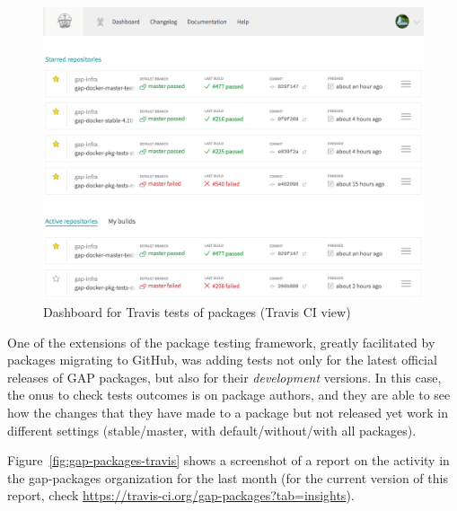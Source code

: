 \begin{figure}[!ht]
    \centering
    \includegraphics[width=\textwidth]{images/gap-infra-travis}
    \caption{Dashboard for Travis tests of \GAP packages (Travis CI view)}
    \label{fig:gap-infra-travis}
\end{figure}

One of the extensions of the package testing framework, greatly 
facilitated by packages migrating to GitHub, was adding tests not
only for the latest official releases of GAP packages, but also
for their \emph{development} versions.
In this case, the onus to check tests outcomes is on package authors,
and they are able to see how the changes that they have made to
a package but not released yet work in different settings (stable/master,
with default/without/with all packages).

Figure~\ref{fig:gap-packages-travis} shows a screenshot of a 
report on the activity in the gap-packages organization 
for the last month (for the current version of 
this report, check \url{https://travis-ci.org/gap-packages?tab=insights}).

